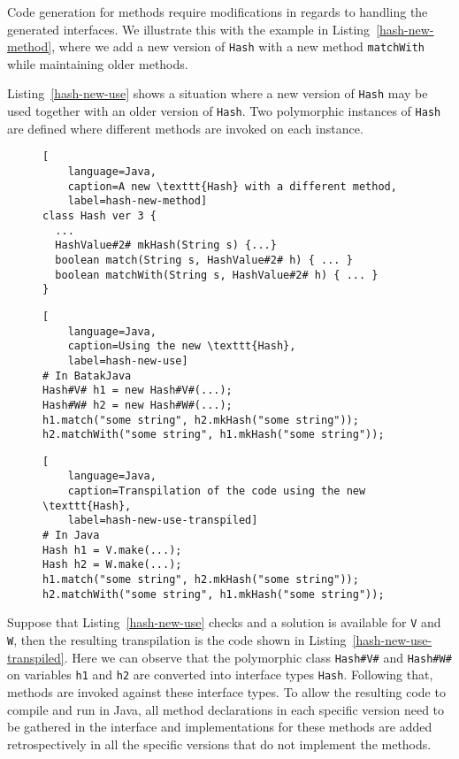 Code generation for methods require modifications in regards to handling the generated interfaces. 
We illustrate this with the example in Listing~\ref{hash-new-method}, where we add a new version 
of \texttt{Hash} with a new method \texttt{matchWith} while maintaining older methods.

Listing~\ref{hash-new-use} shows a situation where a new version of \texttt{Hash} may be used 
together with an older version of \texttt{Hash}. 
Two polymorphic instances of \texttt{Hash} are defined where different methods are invoked on 
each instance. 

\begin{figure}[t]
\begin{lstlisting}[
    language=Java,
    caption=A new \texttt{Hash} with a different method,
    label=hash-new-method]
class Hash ver 3 {
  ...
  HashValue#2# mkHash(String s) {...}
  boolean match(String s, HashValue#2# h) { ... }
  boolean matchWith(String s, HashValue#2# h) { ... }
}
\end{lstlisting}

\begin{lstlisting}[
    language=Java,
    caption=Using the new \texttt{Hash},
    label=hash-new-use]
# In BatakJava
Hash#V# h1 = new Hash#V#(...);
Hash#W# h2 = new Hash#W#(...);
h1.match("some string", h2.mkHash("some string"));
h2.matchWith("some string", h1.mkHash("some string"));
\end{lstlisting}

\begin{lstlisting}[
    language=Java,
    caption=Transpilation of the code using the new \texttt{Hash},
    label=hash-new-use-transpiled]
# In Java
Hash h1 = V.make(...);
Hash h2 = W.make(...);
h1.match("some string", h2.mkHash("some string"));
h2.matchWith("some string", h1.mkHash("some string"));
\end{lstlisting}
\end{figure}

Suppose that Listing~\ref{hash-new-use} checks and a solution is available for \texttt{V} and \texttt{W}, 
then the resulting transpilation is the code shown in Listing~\ref{hash-new-use-transpiled}.
Here we can observe that the polymorphic class \texttt{Hash\#V\#} and \texttt{Hash\#W\#} 
on variables \texttt{h1} and \texttt{h2} are converted into interface types \texttt{Hash}. 
Following that, methods are invoked against these interface types. 
To allow the resulting code to compile and run in Java, all method declarations in each specific version 
need to be gathered in the interface and implementations for these methods are added 
retrospectively in all the specific versions that do not implement the methods.

